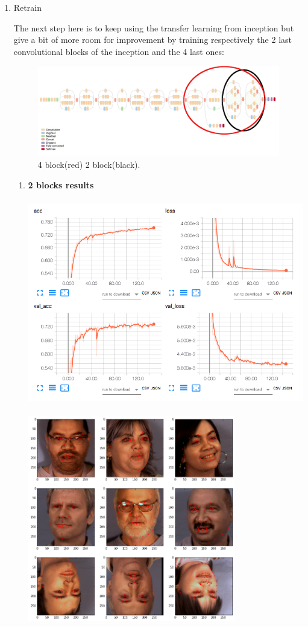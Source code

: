 \documentclass[11pt]{article}
\begin{document}
\begin{enumerate}
\pagebreak


\item Retrain
\label{sec:orgd637277}

The next step here is to keep using the transfer learning from inception but
give a bit of more room for improvement by training respectively the 2 last
convolutional blocks of the inception and the 4 last ones:

\begin{figure}[htbp]
\centering
\includegraphics[width=.9\linewidth]{./images/incep.png}
\caption{4 block(red) 2 block(black).}
\end{figure}


\pagebreak

\begin{enumerate}
\item \textbf{2 blocks results}
\label{sec:org491925f}

\centerline{\includegraphics[height=9cm]{./images/incep249Loss.png}}
\centerline{\includegraphics[height=9cm]{./images/incep249res.png}}


\end{enumerate}
\end{enumerate}
\end{document}
